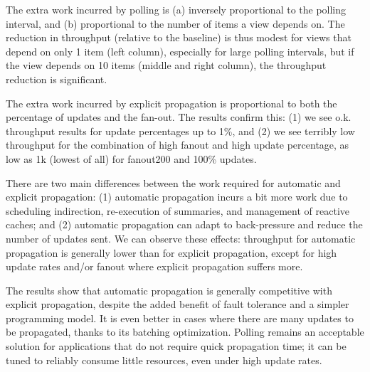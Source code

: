  The extra work incurred by polling is (a) inversely proportional to the polling interval, and (b) proportional to the number of items a view depends on. The reduction in throughput (relative to the baseline) is thus modest for views that depend on only 1 item (left column), especially for large polling intervals, but if the view depends on 10 items (middle and right column), the throughput reduction is significant.

 The extra work incurred by explicit propagation is proportional to both the percentage of updates and the fan-out. The results confirm this: (1) we see o.k. throughput results for update percentages up to 1\%, and (2) we see terribly low throughput for the combination of high fanout and high update percentage, as low as 1k (lowest of all) for fanout200 and 100\% updates.

 There are two main differences between the work required for automatic and explicit propagation: (1) automatic propagation incurs a bit more work due to scheduling indirection, re-execution of summaries, and management of reactive caches;  and (2) automatic propagation can adapt to back-pressure and reduce the number of updates sent.  We can observe these effects: throughput for automatic propagation is generally lower than for explicit propagation, except for high update rates and/or fanout where explicit propagation suffers more. 
 
 The results show that automatic propagation is generally competitive with explicit propagation, despite the added benefit of fault tolerance and a simpler programming model. It is even better in cases where there are many updates to be propagated, thanks to its batching optimization. Polling remains an acceptable solution for applications that do not require quick propagation time; it can be tuned to reliably consume little resources, even under high update rates.

 
 


